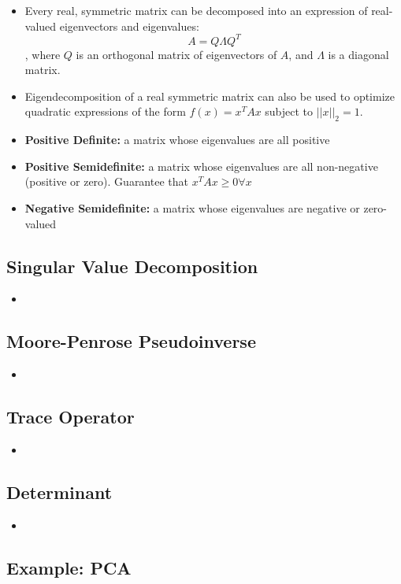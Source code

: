 \begin{itemize}
    \item Every real, symmetric matrix can be decomposed into an expression of real-valued eigenvectors and eigenvalues:
    $$ A = Q \Lambda Q^T$$,
    where $Q$ is an orthogonal matrix of eigenvectors of $A$, and $\Lambda$ is a diagonal matrix.
    \item Eigendecomposition of a real symmetric matrix can also be used to optimize quadratic expressions of the form $f(x) = x^T Ax $ subject to $||x||_2 = 1$.
    \item \textbf{Positive Definite:} a matrix whose eigenvalues are all positive
    \item \textbf{Positive Semidefinite:} a matrix whose eigenvalues are all non-negative (positive or zero). Guarantee that $x^T Ax \geq 0 \forall x$
    \item \textbf{Negative Semidefinite:} a matrix whose eigenvalues are negative or zero-valued
\end{itemize}

\subsection{Singular Value Decomposition}
\begin{itemize}
    \item
\end{itemize}

\subsection{Moore-Penrose Pseudoinverse}
\begin{itemize}
    \item
\end{itemize}

\subsection{Trace Operator}
\begin{itemize}
    \item
\end{itemize}

\subsection{Determinant}
\begin{itemize}
    \item
\end{itemize}

\subsection{Example: PCA}

